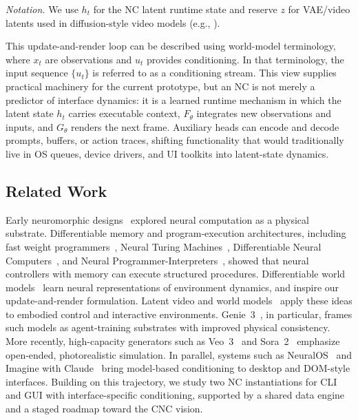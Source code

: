 \noindent\textit{Notation.} We use $h_t$ for the NC latent runtime state and reserve $z$ for VAE/video latents used in diffusion-style video models (e.g., ). 

This update-and-render loop can be described using world-model terminology, where $x_t$ are observations and $u_t$ provides conditioning.
In that terminology, the input sequence $\{u_t\}$ is referred to as a conditioning stream.
This view supplies practical machinery for the current prototype, but an NC is not merely a predictor of interface dynamics: it is a learned runtime mechanism in which the latent state $h_t$ carries executable context, $F_\theta$ integrates new observations and inputs, and $G_\theta$ renders the next frame.
Auxiliary heads can encode and decode prompts, buffers, or action traces, shifting functionality that would traditionally live in OS queues, device drivers, and UI toolkits into latent-state dynamics.

\subsection{Related Work}
\label{section:prelim-related}

Early neuromorphic designs~\citep{mead2012analog} explored neural computation as a physical substrate.
Differentiable memory and program-execution architectures, including fast weight programmers~\citep{schmidhuber92fastweights,schmidhuber93selfref,schmidhuber93ratio}, Neural Turing Machines~\citep{graves2014neural},
Differentiable Neural Computers~\citep{graves2016hybrid}, and Neural Programmer-Interpreters~\citep{reed2015neural}, showed that neural controllers with memory can execute structured procedures.
Differentiable world models~\citep{schmidhuber1990making,schmidhuber2015learning} learn neural representations of environment dynamics, and inspire our update-and-render formulation.
Latent video and world models~\citep{ha2018world,hafner2019learning,hafner2019dream,bruce2024genie} apply these ideas to embodied control and interactive environments.
Genie~3~\citep{bruce2024genie}, in particular, frames such models as agent-training substrates with improved physical consistency.
More recently, high-capacity generators such as Veo~3~\citep{google_veo3_1_2025} and Sora~2~\citep{openai_sora2_2025} emphasize open-ended, photorealistic simulation.
In parallel, systems such as NeuralOS~\citep{rivard2025neuralos} and Imagine with Claude~\citep{anthropic_claude_sonnet4_5_2025} bring model-based conditioning to desktop and DOM-style interfaces.
Building on this trajectory, we study two NC instantiations for CLI and GUI with interface-specific conditioning, supported by a shared data engine and a staged roadmap toward the CNC vision.

